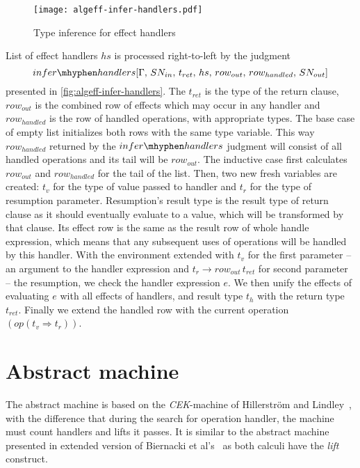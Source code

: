 \documentclass[inz, english, longabstract]{iithesis}
\begin{document}
\begin{figure}
  \centering
  \texttt{[image: algeff-infer-handlers.pdf]}
  \caption{Type inference for effect handlers} 
  \label{fig:algeff-infer-handlers} 
\end{figure} 

List of effect handlers $ hs $ is processed right-to-left by the judgment 
$$ infer\mhyphen handlers [\Gamma , \, SN_{in} , \, t_{ret} , \, hs , \, row_{out} , \, row_{handled} , \, SN_{out}] $$
presented in \autoref{fig:algeff-infer-handlers}.
The $ t_{ret} $ is the type of the return clause, $ row_{out} $ is the combined row of effects which may occur in any handler and $ row_{handled} $ is the row of handled operations, with appropriate types.
The base case of empty list initializes both rows with the same type variable.
This way $ row_{handled} $ returned by the $infer\mhyphen handlers$ judgment will consist of all handled operations and its tail will be $ row_{out} $.
The inductive case first calculates $ row_{out} $ and $ row_{handled} $ for the tail of the list.
Then, two new fresh variables are created: $ t_v $ for the type of value passed to handler and $ t_r $ for the type of resumption parameter.
Resumption's result type is the result type of return clause as it should eventually evaluate to a value, which will be transformed by that clause.
Its effect row is the same as the result row of whole handle expression, which means that any subsequent uses of operations will be handled by this handler.
With the environment extended with $ t_v $ for the first parameter -- an argument to the handler expression and $ t_r \rightarrow row_{out} \, t_{ret} $ for second parameter -- the resumption, we check the handler expression $ e $.
We then unify the effects of evaluating $ e $ with all effects of handlers, and result type $ t_{h} $ with the return type $ t_{ret} $.
Finally we extend the handled row with the current operation $(op (t_v \Rightarrow t_r))$.

\section{Abstract machine}
The abstract machine is based on the \emph{CEK}-machine of Hillerström and Lindley~\cite{Hillerstrom2016}, with the difference that during the search for operation handler, the machine must count handlers and lifts it passes.
It is similar to the abstract machine presented in extended version of Biernacki et al's~\cite{Biernacki2017} as both calculi have the \emph{lift} construct.
\end{document}
